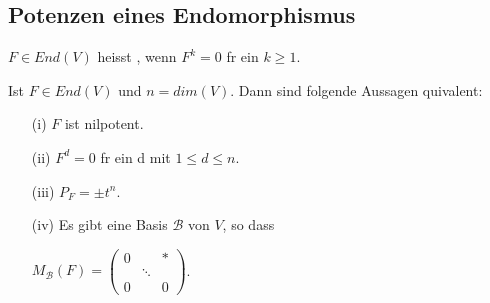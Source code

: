 \documentclass[11pt, a4paper]{article}
\begin{document}
\subsection{Potenzen eines Endomorphismus}
\begin{definition}
$F \in End(V)$ heisst , wenn $F^k = 0$ f\uee r ein $k \geq 1$.
\end{definition}
\begin{theorem}
Ist $F \in End(V)$ und $n = dim(V)$. Dann sind folgende Aussagen \aee quivalent:
\begin{itemize}
\item[(i)] $F$ ist nilpotent.
\item[(ii)] $F^d = 0$ f\uee r ein d mit $1 \leq d \leq n$.
\item[(iii)] $P_F = \pm t^n$.
\item[(iv)] Es gibt eine Basis $\mathcal{B}$ von $V$, so dass 
\\ \centerline{
$M_{\mathcal{B}}(F)=\left(\begin{array}{ccc}
{0} & {} & {*} \\ {} & {\ddots} & {} 
\\ {0} & {} & {0}\end{array}\right)$.
}
\end{itemize}
\end{theorem}
\end{document}
